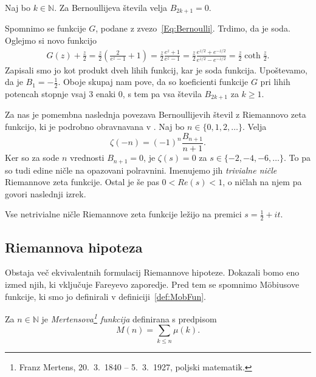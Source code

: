 \documentclass[mat1]{fmfdelo}
\begin{document}
\begin{lema}
Naj bo $k \in \mathbb{N}$. Za Bernoullijeva števila velja $B_{2k+1}=0$.
\end{lema}

\begin{dokaz}
Spomnimo se funkcije $G$, podane z zvezo~\eqref{Eq:Bernoulli}. Trdimo, da je soda. Oglejmo si novo funkcijo
\begin{align}
G(z) + \frac{z}{2} = \frac{z}{2} \left( \frac{2}{e^{z}-1}+1 \right) = \frac{z}{2} \frac{e^{z}+1}{e^{z}-1} 
	= \frac{z}{2} \frac{e^{z/2}+e^{-z/2}}{e^{z/2}-e^{-z/2}} = \frac{z}{2} \coth{\frac{z}{2}}.
\end{align}
%
Zapisali smo jo kot produkt dveh lihih funkcij, kar je soda funkcija. Upoštevamo, da je $B_{1}=-\frac{1}{2}$. Oboje skupaj nam pove, da so koeficienti funkcije $G$ pri lihih potencah stopnje vsaj $3$ enaki $0$, s tem pa vsa števila $B_{2k+1}$ za $k \geq 1$.
\end{dokaz}

Za nas je pomembna naslednja povezava Bernoullijevih števil z Riemannovo zeta funkcijo, ki je podrobno obravnavana v \cite[poglavje 1.5]{zetafunction}. Naj bo $n\in\{0, 1, 2, \dots\}$. Velja
\begin{equation}
	\zeta(-n) = (-1)^n \frac{B_{n+1}}{n+1}.
\end{equation}
Ker so za sode $n$ vrednosti $B_{n+1}=0$, je $\zeta(s)=0$ za $s\in\{-2,-4,-6,\dots\}$. To pa so tudi edine ničle na opazovani polravnini. Imenujemo jih \emph{trivialne ničle} Riemannove zeta funkcije. Ostal je še pas $0<Re(s)<1$, o ničlah na njem pa govori naslednji izrek. 

\begin{izrek}
Vse netrivialne ničle Riemannove zeta funkcije ležijo na premici $s=\frac{1}{2}+it$.
\end{izrek}

\subsection{Riemannova hipoteza}

Obstaja več ekvivalentnih formulacij Riemannove hipoteze. Dokazali bomo eno izmed njih, ki vključuje Fareyevo zaporedje. Pred tem se spomnimo M\"obiusove funkcije, ki smo jo definirali v definiciji~\ref{def:MobFun}.

\begin{definicija}
Za $n\in\mathbb{N}$ je \emph{Mertensova\footnote{Franz Mertens, 20.\ 3.\ 1840 -- 5.\ 3.\ 1927, poljski matematik.} funkcija} definirana s predpisom
\begin{equation}
M(n)=\sum_{k\leq n}\mu(k).
\end{equation}
\end{definicija}
\end{document}
